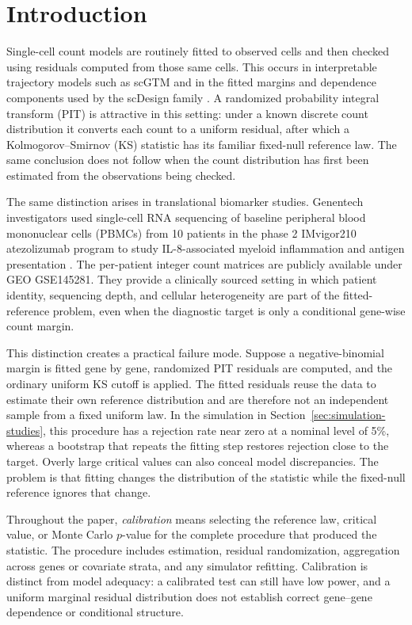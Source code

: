 \documentclass[preprint,12pt]{elsarticle}
\theoremstyle{plain}
\theoremstyle{remark}
\begin{document}
\section{Introduction}\label{sec:introduction}

Single-cell count models are routinely fitted to observed cells and then
checked using residuals computed from those same cells. This occurs in
interpretable trajectory models such as scGTM and in the fitted margins and
dependence components used by the scDesign family
\citep{li2019scdesign,sun2021scdesign2,cui2022scgtm,song2024scdesign3}. A
randomized probability integral transform (PIT) is attractive in this setting:
under a known discrete count distribution it converts each count to a uniform
residual, after which a Kolmogorov--Smirnov (KS) statistic has its familiar
fixed-null reference law. The same conclusion does not follow when the count
distribution has first been estimated from the observations being checked.

The same distinction arises in translational biomarker studies. Genentech
investigators used single-cell RNA sequencing of baseline peripheral blood
mononuclear cells (PBMCs) from 10 patients in the phase 2 IMvigor210
atezolizumab program to study IL-8-associated myeloid inflammation and antigen
presentation \citep{rosenberg2016atezolizumab,yuen2020il8}. The per-patient
integer count matrices are publicly available under GEO GSE145281. They provide
a clinically sourced setting in which patient identity, sequencing depth, and
cellular heterogeneity are part of the fitted-reference problem, even when the
diagnostic target is only a conditional gene-wise count margin.

This distinction creates a practical failure mode. Suppose a negative-binomial
margin is fitted gene by gene, randomized PIT residuals are computed, and the
ordinary uniform KS cutoff is applied. The fitted residuals reuse the data to
estimate their own reference distribution and are therefore not an independent
sample from a fixed uniform law. In the simulation in
Section~\ref{sec:simulation-studies}, this procedure has a rejection rate near
zero at a nominal level of 5\%, whereas a bootstrap that repeats the fitting
step restores rejection close to the target. Overly large critical values can
also conceal model discrepancies. The problem is that fitting changes the
distribution of the statistic while the fixed-null reference ignores that
change.

Throughout the paper, \emph{calibration} means selecting the reference law,
critical value, or Monte Carlo $p$-value for the complete procedure that
produced the statistic. The procedure includes estimation, residual
randomization, aggregation across genes or covariate strata, and any simulator
refitting. Calibration is distinct from model adequacy: a calibrated test can
still have low power, and a uniform marginal residual distribution does not
establish correct gene--gene dependence or conditional structure.
\end{document}
